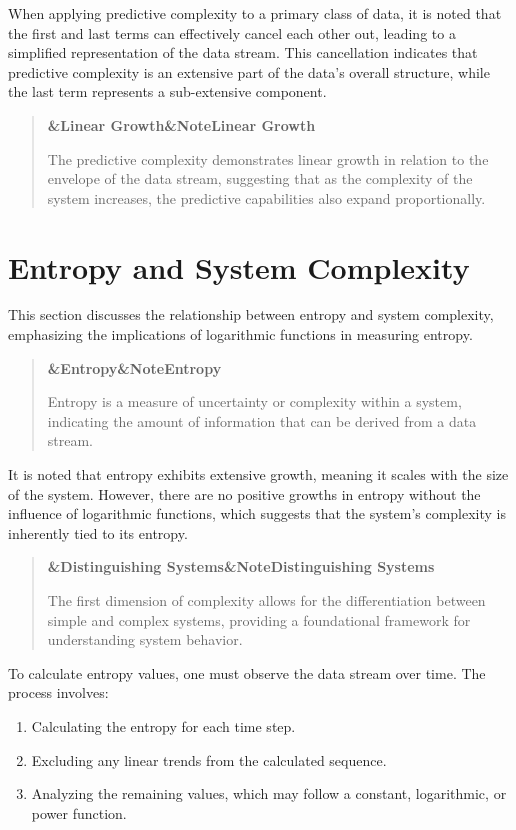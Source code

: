 \documentclass[a4paper]{article}
\newcommand{\boxheading}[1]{%
  \par\smallskip
  \noindent\textbf{\ifx&#1&Note\else#1\fi}\par
  \smallskip
}
\newenvironment{defbox}[1][]{%
  \begin{quote}\color{green!40!black}\boxheading{#1}\normalcolor
}{\end{quote}}
\newenvironment{rembox}[1][]{%
  \begin{quote}\color{black!70}\boxheading{#1}\normalcolor
}{\end{quote}}
\begin{document}
When applying predictive complexity to a primary class of data, it is noted that the first and last terms can effectively cancel each other out, leading to a simplified representation of the data stream. This cancellation indicates that predictive complexity is an extensive part of the data's overall structure, while the last term represents a sub-extensive component.

\begin{rembox}[Linear Growth]
The predictive complexity demonstrates linear growth in relation to the envelope of the data stream, suggesting that as the complexity of the system increases, the predictive capabilities also expand proportionally.
\end{rembox}

\section{Entropy and System Complexity}
This section discusses the relationship between entropy and system complexity, emphasizing the implications of logarithmic functions in measuring entropy.

\begin{defbox}[Entropy]
Entropy is a measure of uncertainty or complexity within a system, indicating the amount of information that can be derived from a data stream.
\end{defbox}

It is noted that entropy exhibits extensive growth, meaning it scales with the size of the system. However, there are no positive growths in entropy without the influence of logarithmic functions, which suggests that the system's complexity is inherently tied to its entropy.

\begin{rembox}[Distinguishing Systems]
The first dimension of complexity allows for the differentiation between simple and complex systems, providing a foundational framework for understanding system behavior.
\end{rembox}

To calculate entropy values, one must observe the data stream over time. The process involves:

\begin{enumerate}
    \item Calculating the entropy for each time step.
    \item Excluding any linear trends from the calculated sequence.
    \item Analyzing the remaining values, which may follow a constant, logarithmic, or power function.
\end{enumerate}
\end{document}

